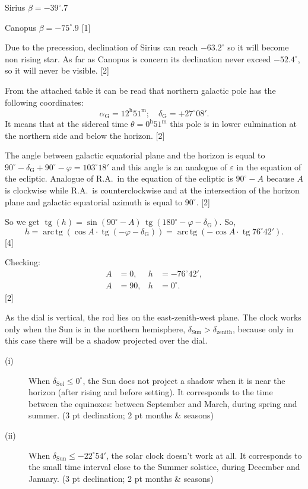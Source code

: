 Sirius $\beta = -39^\circ\!.7$

Canopus $\beta = -75^\circ\!.9$ \hfill[1]

Due to the precession, declination of Sirius can reach $-63.2^\circ$ so it
will become non rising star. As far as Canopus is concern its declination
never exceed $-52.4^\circ$, so it will never be visible. \hfill[2]

From the attached table it can be read that northern galactic pole has the
following coordinates:
\[
  \alpha_{\mathrm{G}} = 12^{\mathrm{h}}51^{\mathrm{m}};\quad
  \delta_{\mathrm{G}} = +27^\circ 08'.
\]
It means that at the sidereal time
$\theta = 0^{\mathrm{h}}51^{\mathrm{m}}$ this pole is in lower culmination at
the northern side and below the horizon. \hfill[2]

The angle between galactic equatorial plane and the horizon is equal to
$90^\circ - \delta_{\mathrm{G}} + 90^\circ - \varphi = 103^\circ 18'$ and this
angle is an analogue of $\varepsilon$ in the equation of the ecliptic.
Analogue of R.A.\ in the equation of the ecliptic is $90^\circ - A$ because
$A$ is clockwise while R.A.\ is counterclockwise and at the intersection of
the horizon plane and galactic equatorial azimuth is equal to $90^\circ$.
\hfill[2]

So we get
$\operatorname{tg}(h) = \sin(90^\circ - A)\,
  \operatorname{tg}(180^\circ - \varphi - \delta_{\mathrm{G}})$. So,
\[
  h = \operatorname{arc\,tg}\left(\cos A \cdot
        \operatorname{tg}(-\varphi - \delta_{\mathrm{G}})\right)
    = \operatorname{arc\,tg}\left(-\cos A \cdot
        \operatorname{tg} 76^\circ 42'\right).
\]
\hfill[4]

Checking:
\begin{align*}
  A &= 0, & h &= -76^\circ 42', \\
  A &= 90, & h &= 0^\circ.
\end{align*}
\hfill[2]

As the dial is vertical, the rod lies on the east-zenith-west plane. The
clock works only when the Sun is in the northern hemisphere,
$\delta_{\mathrm{Sun}} > \delta_{\mathrm{zenith}}$, because only in this case
there will be a shadow projected over the dial.


\begin{description}
\item[(i)] When $\delta_{\mathrm{Sol}} \le 0^\circ$, the Sun does not project
  a shadow when it is near the horizon (after rising and before setting). It
  corresponds to the time between the equinoxes: between September and March,
  during spring and summer.
  \hfill(3 pt declination; 2 pt months \& seasons)
\item[(ii)] When $\delta_{\mathrm{Sun}} \le -22^\circ 54'$, the solar clock
  doesn't work at all. It corresponds to the small time interval close to the
  Summer solstice, during December and January.
  \hfill(3 pt declination; 2 pt months \& seasons)
\end{description}

